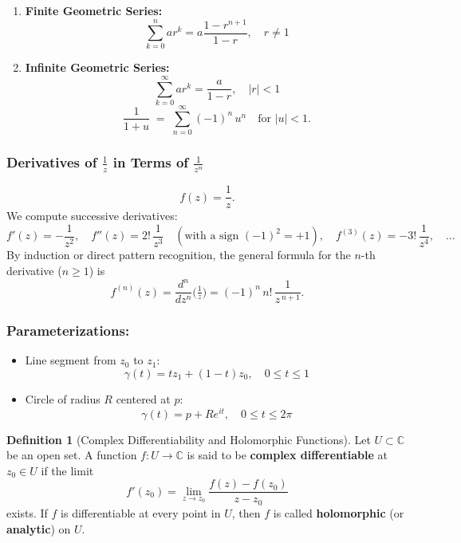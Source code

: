 \documentclass[12pt]{article}
\theoremstyle{definition} %
\newtheorem{definition}{Definition}
\theoremstyle{plain} %
\begin{document}
\begin{enumerate}

\item \textbf{Finite Geometric Series:}
\[
\sum_{k=0}^{n} ar^k = a\frac{1 - r^{n+1}}{1 - r}, \quad r \neq 1
\]

\item \textbf{Infinite Geometric Series:}
\[
\sum_{k=0}^{\infty} ar^k = \frac{a}{1 - r}, \quad |r| < 1
\]
\[
\frac{1}{1+u} 
\;=\; \sum_{n=0}^{\infty} (-1)^n\,u^n
\quad\text{for }|u| < 1.
\]


\end{enumerate}
\subsubsection*{Derivatives of \(\displaystyle \frac{1}{z}\) in Terms of \(\frac{1}{z^n}\)}

\[
f(z) = \frac{1}{z}.
\]
We compute successive derivatives:
\[
f'(z) = -\frac{1}{z^2},\quad
f''(z) = 2!\,\frac{1}{z^3} \quad(\text{with a sign }(-1)^2=+1),
\quad
f^{(3)}(z) = -3!\,\frac{1}{z^4}, 
\quad \dots
\]
By induction or direct pattern recognition, the general formula for the \(n\)-th derivative (\(n\ge 1\)) is
\[
f^{(n)}(z) 
= \frac{d^n}{dz^n}\bigl(\tfrac{1}{z}\bigr)
= (-1)^n\,n!\,\frac{1}{z^{\,n+1}}.
\]
\subsubsection*{Parameterizations:}

\begin{itemize}
    \item Line segment from \( z_0 \) to \( z_1 \):
    \[
    \gamma(t) = t z_1 + (1 - t) z_0, \quad 0 \leq t \leq 1
    \]

    \item Circle of radius \( R \) centered at \( p \):
    \[
    \gamma(t) = p + R e^{i t}, \quad 0 \leq t \leq 2\pi
    \]
\end{itemize}


\begin{definition}[Complex Differentiability and Holomorphic Functions]
Let \(U \subset \mathbb{C}\) be an open set. A function \(f: U \to \mathbb{C}\) is said to be \textbf{complex differentiable} at \(z_0 \in U\) if the limit
\[
f'(z_0) = \lim_{z \to z_0} \frac{f(z)-f(z_0)}{z-z_0}
\]
exists. If \(f\) is differentiable at every point in \(U\), then \(f\) is called \textbf{holomorphic} (or \textbf{analytic}) on \(U\).
\end{definition}
\end{document}
